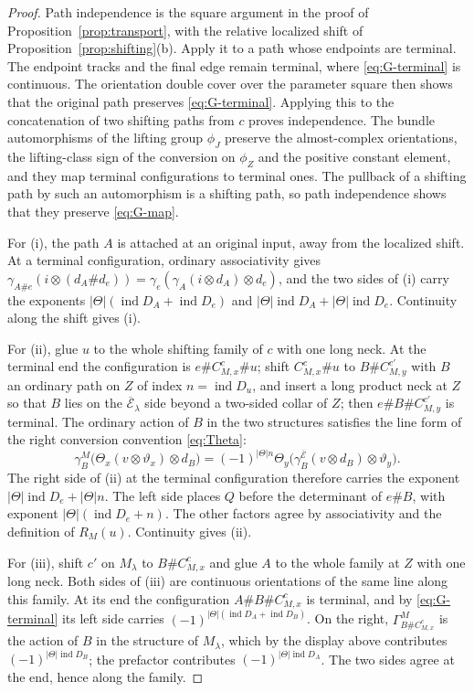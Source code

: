 \documentclass[11pt]{amsart}
\theoremstyle{definition}
\theoremstyle{remark}
\theoremstyle{plain}
\numberwithin{equation}{section}
\newcommand{\ind}{\operatorname{ind}}
\begin{document}
\begin{proof}
Path independence is the square argument in the proof of
Proposition~\ref{prop:transport}, with the relative localized shift of
Proposition~\ref{prop:shifting}(b). Apply it to a path whose endpoints
are terminal. The endpoint tracks and the final edge remain terminal,
where \eqref{eq:G-terminal} is continuous. The orientation double
cover over the parameter square then shows that the original path
preserves \eqref{eq:G-terminal}. Applying this to the concatenation
of two shifting paths from $c$ proves independence. The bundle automorphisms of the
lifting group $\phi_J$ preserve the almost-complex orientations, the lifting-class sign of the conversion on $\phi_Z$ and the positive constant element, and they
map terminal configurations to terminal ones. The pullback of a shifting
path by such an automorphism is a shifting path, so path independence shows
that they preserve \eqref{eq:G-map}.

For (i), the path $A$ is attached at an original input, away from the
localized shift. At a terminal configuration, ordinary associativity
gives $\gamma_{A\#e}(i\otimes(d_A\# d_e))
=\gamma_e(\gamma_A(i\otimes d_A)\otimes d_e)$, and the two sides of
(i) carry the exponents $|\Theta|(\ind D_A+\ind D_e)$ and
$|\Theta|\ind D_A+|\Theta|\ind D_e$. Continuity along the shift gives (i).

For (ii), glue $u$ to the whole shifting family of $c$ with one
long neck. At the terminal end the configuration is $e\#C^c_{M,x}\#u$;
shift $C^c_{M,x}\#u$ to $B\#C^{c'}_{M,y}$ with $B$ an ordinary path on $Z$
of index $n=\ind D_u$, and insert a long product neck at $Z$ so that
$B$ lies on the $\overline{\mathcal E}_\lambda$ side beyond a two-sided
collar of $Z$; then $e\#B\#C^{c'}_{M,y}$ is terminal. The ordinary action of $B$ in the two
structures satisfies the line form of the right conversion
convention \eqref{eq:Theta}:
\[
 \gamma^M_B\bigl(\Theta_x(v\otimes \vartheta_x)\otimes d_B\bigr)
 =(-1)^{|\Theta|n}\Theta_y\bigl(\gamma^{\overline{\mathcal E}}_B(v\otimes d_B)\otimes \vartheta_y\bigr).
\]
The right side of (ii) at the terminal configuration therefore
carries the exponent $|\Theta|\ind D_e+|\Theta|n$. The left side places $Q$ before
the determinant of $e\#B$, with exponent $|\Theta|(\ind D_e+n)$. The other
factors agree by associativity and the definition of $R_M(u)$.
Continuity gives (ii).

For (iii), shift $c'$ on $M_\lambda$ to $B\#C^{c}_{M,x}$ and glue $A$ to
the whole family at $Z$ with one long neck. Both sides of (iii) are
continuous orientations of the same line along this family. At its
end the configuration $A\#B\#C^{c}_{M,x}$ is terminal, and by
\eqref{eq:G-terminal} its left side carries
$(-1)^{|\Theta|(\ind D_A+\ind D_B)}$. On the right,
$\Gamma^M_{B\#C^{c}_{M,x}}$ is the action of $B$ in the structure of
$M_\lambda$, which by the display above contributes
$(-1)^{|\Theta|\ind D_B}$; the prefactor contributes $(-1)^{|\Theta|\ind D_A}$.
The two sides agree at the end, hence along the family.
\end{proof}
\end{document}
